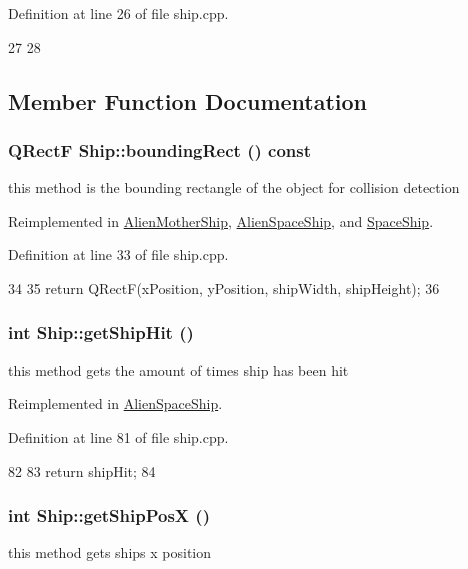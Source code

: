Definition at line 26 of file ship.cpp.


\begin{DoxyCode}
27 {
28 }
\end{DoxyCode}


\subsection{Member Function Documentation}
\hypertarget{class_ship_a40856df827844b4045eb97345f401995}{
\subsubsection[{boundingRect}]{\setlength{\rightskip}{0pt plus 5cm}QRectF Ship::boundingRect () const}}
\label{class_ship_a40856df827844b4045eb97345f401995}
this method is the bounding rectangle of the object for collision detection 

Reimplemented in \hyperlink{class_alien_mother_ship_a19b3012b5de609d1b3aeb853bc45489f}{AlienMotherShip}, \hyperlink{class_alien_space_ship_ab99ad296ecc69ab1b84bf692eaeb775e}{AlienSpaceShip}, and \hyperlink{class_space_ship_a209b405c57298a7fd22edcf609d9ab36}{SpaceShip}.

Definition at line 33 of file ship.cpp.


\begin{DoxyCode}
34 {
35     return QRectF(xPosition, yPosition, shipWidth, shipHeight);
36 }
\end{DoxyCode}
\hypertarget{class_ship_ab8efcfc8f38e0b231b99585846e676c5}{
\subsubsection[{getShipHit}]{\setlength{\rightskip}{0pt plus 5cm}int Ship::getShipHit ()}}
\label{class_ship_ab8efcfc8f38e0b231b99585846e676c5}
this method gets the amount of times ship has been hit 

Reimplemented in \hyperlink{class_alien_space_ship_ab6ff56db6d322e2023611315e53c4895}{AlienSpaceShip}.

Definition at line 81 of file ship.cpp.


\begin{DoxyCode}
82 {
83        return shipHit;
84 }
\end{DoxyCode}
\hypertarget{class_ship_a32927e82496a210417b18e0910748878}{
\subsubsection[{getShipPosX}]{\setlength{\rightskip}{0pt plus 5cm}int Ship::getShipPosX ()}}
\label{class_ship_a32927e82496a210417b18e0910748878}
this method gets ships x position 


